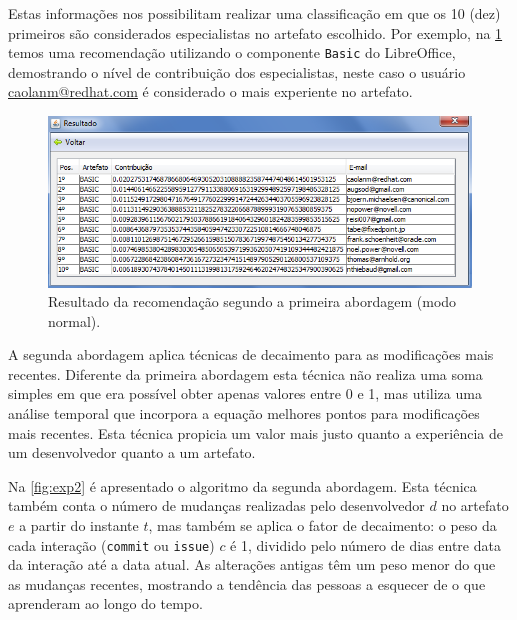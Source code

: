 \documentclass[oneside,brazil,a4paper]{normas-utf-tex}
\begin{document}
Estas informações nos possibilitam realizar uma classificação em que os 10 (dez) primeiros são considerados especialistas no artefato escolhido. Por exemplo, na \cref{fig:processNormal}  temos uma recomendação utilizando o componente \texttt{Basic} do LibreOffice, demostrando o nível de contribuição dos especialistas, neste caso o usuário \url{caolanm@redhat.com} é considerado o mais experiente no artefato.

\begin{figure}[!htb]
    \centering
    \includegraphics[width= .9\textwidth]{figuras/resultadoNormal}
    \caption{Resultado da recomendação segundo a primeira abordagem (modo normal).}
    \label{fig:processNormal}
\end{figure}

A segunda abordagem aplica técnicas de decaimento para as modificações mais recentes. Diferente da primeira abordagem esta técnica não realiza uma soma simples em que era possível obter apenas valores entre 0 e 1, mas utiliza uma análise temporal que incorpora a equação melhores pontos para modificações mais recentes. Esta técnica propicia um valor mais justo quanto a experiência de um desenvolvedor quanto a um artefato. 

Na \cref{fig:exp2} é apresentado o algoritmo da segunda abordagem. Esta técnica também conta o número de mudanças realizadas pelo desenvolvedor $d$ no artefato $e$ a partir do instante $t$, mas também se aplica o fator de decaimento: o peso da cada interação (\texttt{commit} ou \texttt{issue}) $c$ é 1, dividido pelo número de dias entre data da interação até a data atual. As alterações antigas têm um peso menor do que as mudanças recentes, mostrando a tendência das pessoas a esquecer de o que aprenderam ao longo do tempo.
\end{document}
